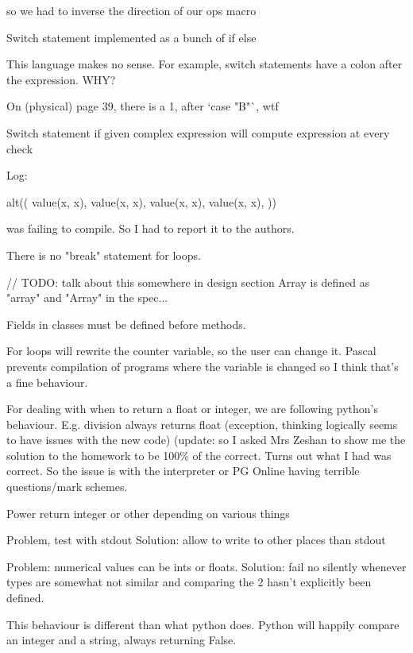 \documentclass{article}
\begin{document}
so we had to inverse the direction of our ops macro


Switch statement implemented as a bunch of if else

This language makes no sense. For example, switch statements have a colon after
the expression. WHY?

On (physical) page 39, there is a 1, after `case "B"`, wtf

Switch statement if given complex expression will compute expression at every
check

Log:


alt((
	value(x, x),
	value(x, x),
	value(x, x),
	value(x, x),
))

was failing to compile. So I had to report it to the authors.

There is no "break" statement for loops.

// TODO: talk about this somewhere in design section
Array is defined as "array" and "Array" in the spec...

Fields in classes must be defined before methods.

For loops will rewrite the counter variable, so the user can change it.
Pascal prevents compilation of programs where the variable is changed so I
think that's a fine behaviour.

For dealing with when to return a float or integer, we are following python's
behaviour. E.g. division always returns float (exception, thinking logically
seems to have issues with the new code) (update: so I asked Mrs Zeshan to show
me the solution to the homework to be 100\% of the correct. Turns out what I
had was correct. So the issue is with the interpreter or PG Online having
terrible questions/mark schemes.

Power return integer or other depending on various things

Problem, test with stdout
Solution: allow to write to other places than stdout

Problem: numerical values can be ints or floats.
Solution: fail no silently whenever types are somewhat not similar and
comparing the 2 hasn't explicitly been defined.

This behaviour is different than what python does. Python will happily compare
an integer and a string, always returning False.
\end{document}
